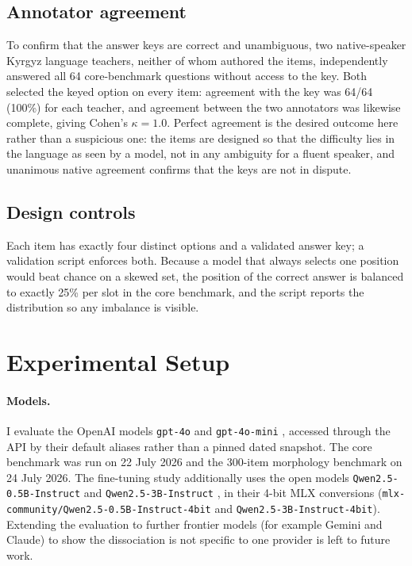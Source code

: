 \documentclass{article}
\begin{document}
\subsection{Annotator agreement}

To confirm that the answer keys are correct and unambiguous, two native-speaker Kyrgyz
language teachers, neither of whom authored the items, independently answered all 64
core-benchmark questions without access to the key. Both selected the keyed option on
every item: agreement with the key was 64/64 (100\%) for each teacher, and agreement
between the two annotators was likewise complete, giving Cohen's $\kappa = 1.0$.
Perfect agreement is the desired outcome here rather than a suspicious one: the items
are designed so that the difficulty lies in the language as seen by a model, not in any
ambiguity for a fluent speaker, and unanimous native agreement confirms that the keys
are not in dispute.

\subsection{Design controls}

Each item has exactly four distinct options and a validated answer key; a validation
script enforces both. Because a model that always selects one position would beat
chance on a skewed set, the position of the correct answer is balanced to exactly
25\% per slot in the core benchmark, and the script reports the distribution so any
imbalance is visible.

\section{Experimental Setup}
\label{sec:setup}

\paragraph{Models.} I evaluate the OpenAI models \texttt{gpt-4o} and
\texttt{gpt-4o-mini} \cite{openai2023gpt4}, accessed through the API by their default
aliases rather than a pinned dated snapshot. The core benchmark was run on 22 July 2026
and the 300-item morphology benchmark on 24 July 2026. The fine-tuning study
additionally uses the open models \texttt{Qwen2.5-0.5B-Instruct} and
\texttt{Qwen2.5-3B-Instruct} \cite{qwen2025}, in their 4-bit MLX conversions
(\texttt{mlx-community/Qwen2.5-0.5B-Instruct-4bit} and \texttt{Qwen2.5-3B-Instruct-4bit}).
Extending the evaluation to further frontier models (for example Gemini and Claude) to
show the dissociation is not specific to one provider is left to future work.
\end{document}
